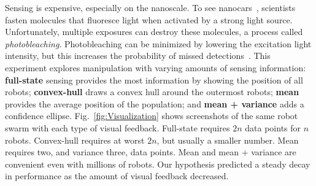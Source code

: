 Sensing is expensive, especially on the nanoscale. To see nanocars~\cite{Chiang2011}, scientists fasten molecules that fluoresce light when activated by a strong light source. Unfortunately, multiple exposures can destroy these molecules, a process called \emph{photobleaching}. Photobleaching can be minimized by lowering the excitation light intensity, but this increases the probability of missed detections~\cite{Cazes2001}.  This experiment explores manipulation with varying amounts of sensing information: {\bf full-state} sensing provides the most information by showing the position of all robots; {\bf convex-hull} draws a convex hull around the outermost robots; {\bf mean} provides the average position of the population; and {\bf mean + variance} adds a confidence ellipse. Fig.~\ref{fig:Visualization} shows screenshots of the same robot swarm with each type of visual feedback. Full-state requires $2n$ data points for $n$ robots. Convex-hull requires at worst $2n$, but usually a smaller number.  Mean requires two, and variance three, data points.  Mean and mean + variance are convenient even with millions of robots. Our hypothesis predicted a steady decay in performance as the amount of visual feedback decreased.

%


